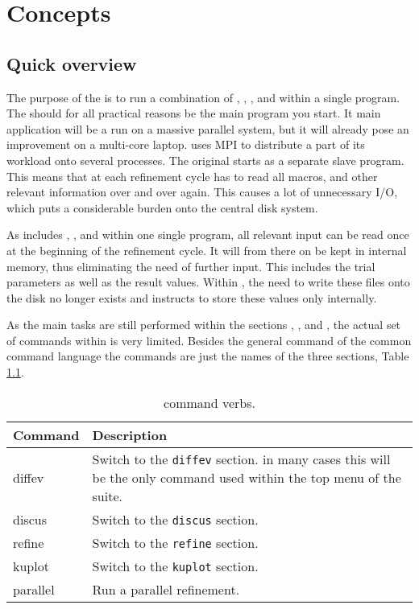 
\chapter{Concepts \label{concepts}}
\section{Quick overview } 

The purpose of the \Suite is to run a combination of 
\href{./diffev\_man.pdf}\diffev, 
\href{./discus\_man.pdf}\discus,
\href{./refine\_man.pdf}, 
and 
\href{./kuplot\_man.pdf}\Kuplot within a single program. The \Suite 
should for all practical reasons be the main program you start.
It main application  will be a 
run on a massive parallel system, but it will already pose an 
improvement on a multi-core laptop. \Suite uses MPI to distribute 
a part of its workload onto several processes. The original \Diffev
starts \Discus as a separate slave program. This means that at each refinement
cycle \Discus has to read all macros, and other relevant information over and 
over again. This causes a lot of unnecessary I/O, which puts a considerable
burden onto the central disk system.

As \Suite includes \diffev, \discus,  and \Kuplot within one single program,
all relevant input can be read once at the beginning of the refinement cycle.
It will from there on be kept in internal memory, thus eliminating the need of
further input. This includes the trial parameters as well as the result values.
Within \suite, the need to write these files onto the disk no longer exists and 
\Suite instructs \Diffev to store these values only internally.  

As the main tasks are still performed within the sections \diffev, \discus,
 and \kuplot, the actual set of commands within \Suite is very limited. 
Besides the general command of the common command language the commands are
just the names of the three sections, Table \ref{cmd-tab}.

\begin{table}[!b]
\centering
\begin{tabularx}{\textwidth}{|p{30mm}|X|}
  \hline
  {\bf Command } & {\bf Description} \\
  \hline
  diffev & Switch to the {\tt diffev} section. in many cases this
           will be the only command used within the top menu of
           the suite.\\
  \hline
  discus & Switch to the {\tt discus} section.\\
  \hline
  refine & Switch to the {\tt refine} section.\\
  \hline
  kuplot & Switch to the {\tt kuplot} section.\\
  \hline
  parallel & Run a parallel refinement. \\
  \hline
\end{tabularx}
\caption[\Suite command verbs ]
        {\label{cmd-tab}\Suite command verbs.}
\end{table}

